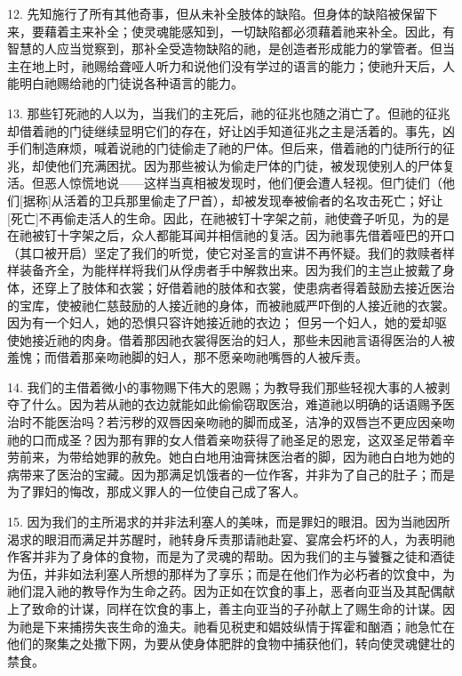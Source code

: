 12. 先知施行了所有其他奇事，但从未补全肢体的缺陷。但身体的缺陷被保留下来，要藉着主来补全；使灵魂能感知到，一切缺陷都必须藉着祂来补全。因此，有智慧的人应当觉察到，那补全受造物缺陷的祂，是创造者形成能力的掌管者。但当主在地上时，祂赐给聋哑人听力和说他们没有学过的语言的能力；使祂升天后，人能明白祂赐给祂的门徒说各种语言的能力。\par

13. 那些钉死祂的人以为，当我们的主死后，祂的征兆也随之消亡了。但祂的征兆却借着祂的门徒继续显明它们的存在，好让凶手知道征兆之主是活着的。事先，凶手们制造麻烦，喊着说祂的门徒偷走了祂的尸体。但后来，借着祂的门徒所行的征兆，却使他们充满困扰。因为那些被认为偷走尸体的门徒，被发现使别人的尸体复活。但恶人惊慌地说——这样当真相被发现时，他们便会遭人轻视。但门徒们（他们[据称]从活着的卫兵那里偷走了尸首），却被发现奉被偷者的名攻击死亡；好让[死亡]不再偷走活人的生命。因此，在祂被钉十字架之前，祂使聋子听见，为的是在祂被钉十字架之后，众人都能耳闻并相信祂的复活。因为祂事先借着哑巴的开口（其口被开启）坚定了我们的听觉，使它对圣言的宣讲不再怀疑。我们的救赎者样样装备齐全，为能样样将我们从俘虏者手中解救出来。因为我们的主岂止披戴了身体，还穿上了肢体和衣裳；好借着祂的肢体和衣裳，使患病者得着鼓励去接近医治的宝库，使被祂仁慈鼓励的人接近祂的身体，而被祂威严吓倒的人接近祂的衣裳。因为有一个妇人，她的恐惧只容许她接近祂的衣边； 但另一个妇人，她的爱却驱使她接近祂的肉身。借着那因祂衣裳得医治的妇人，那些未因祂言语得医治的人被羞愧；而借着那亲吻祂脚的妇人，那不愿亲吻祂嘴唇的人被斥责。\par

14. 我们的主借着微小的事物赐下伟大的恩赐；为教导我们那些轻视大事的人被剥夺了什么。因为若从祂的衣边就能如此偷偷窃取医治，难道祂以明确的话语赐予医治时不能医治吗？若污秽的双唇因亲吻祂的脚而成圣，洁净的双唇岂不更应因亲吻祂的口而成圣？因为那有罪的女人借着亲吻获得了祂圣足的恩宠，这双圣足带着辛劳前来，为带给她罪的赦免。她白白地用油膏抹医治者的脚，因为祂白白地为她的病带来了医治的宝藏。因为那满足饥饿者的一位作客，并非为了自己的肚子；而是为了罪妇的悔改，那成义罪人的一位使自己成了客人。\par

15. 因为我们的主所渴求的并非法利塞人的美味，而是罪妇的眼泪。因为当祂因所渴求的眼泪而满足并苏醒时，祂转身斥责那请祂赴宴、宴席会朽坏的人，为表明祂作客并非为了身体的食物，而是为了灵魂的帮助。因为我们的主与饕餮之徒和酒徒为伍，并非如法利塞人所想的那样为了享乐；而是在他们作为必朽者的饮食中，为祂们混入祂的教导作为生命之药。因为正如在饮食的事上，恶者向亚当及其配偶献上了致命的计谋，同样在饮食的事上，善主向亚当的子孙献上了赐生命的计谋。因为祂是下来捕捞失丧生命的渔夫。祂看见税吏和娼妓纵情于挥霍和酗酒；祂急忙在他们的聚集之处撒下网，为要从使身体肥胖的食物中捕获他们，转向使灵魂健壮的禁食。\par


